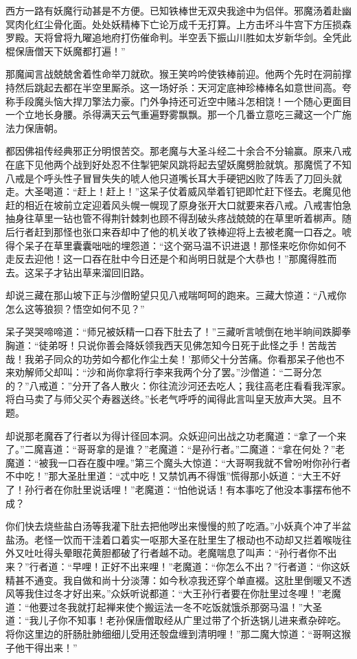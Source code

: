 \documentclass[12pt,UTF8]{ctexbook}
\begin{document}
西方一路有妖魔行动甚是不方便。已知铁棒世无双央我途中为侣伴。邪魔汤着赴幽冥肉化红尘骨化面。处处妖精棒下亡论万成千无打算。上方击坏斗牛宫下方压损森罗殿。天将曾将九曜追地府打伤催命判。半空丢下振山川胜如太岁新华剑。全凭此棍保唐僧天下妖魔都打遍！”

那魔闻言战兢兢舍着性命举刀就砍。猴王笑吟吟使铁棒前迎。他两个先时在洞前撑持然后跳起去都在半空里厮杀。这一场好杀：天河定底神珍棒棒名如意世间高。夸称手段魔头恼大捍刀擎法力豪。门外争持还可近空中赌斗怎相饶！一个随心更面目一个立地长身腰。杀得满天云气重遍野雾飘飘。那一个几番立意吃三藏这一个广施法力保唐朝。

都因佛祖传经典邪正分明恨苦交。那老魔与大圣斗经二十余合不分输赢。原来八戒在底下见他两个战到好处忍不住掣钯架风跳将起去望妖魔劈脸就筑。那魔慌了不知八戒是个呼头性子冒冒失失的唬人他只道嘴长耳大手硬钯凶败了阵丢了刀回头就走。大圣喝道：“赶上！赶上！”这呆子仗着威风举着钉钯即忙赶下怪去。老魔见他赶的相近在坡前立定迎着风头幌一幌现了原身张开大口就要来吞八戒。八戒害怕急抽身往草里一钻也管不得荆针棘刺也顾不得刮破头疼战兢兢的在草里听着梆声。随后行者赶到那怪也张口来吞却中了他的机关收了铁棒迎将上去被老魔一口吞之。唬得个呆子在草里囊囊咄咄的埋怨道：“这个弼马温不识进退！那怪来吃你你如何不走反去迎他！这一口吞在肚中今日还是个和尚明日就是个大恭也！”那魔得胜而去。这呆子才钻出草来溜回旧路。

却说三藏在那山坡下正与沙僧盼望只见八戒喘呵呵的跑来。三藏大惊道：“八戒你怎么这等狼狈？悟空如何不见？”

呆子哭哭啼啼道：“师兄被妖精一口吞下肚去了！”三藏听言唬倒在地半晌间跌脚拳胸道：“徒弟呀！只说你善会降妖领我西天见佛怎知今日死于此怪之手！苦哉苦哉！我弟子同众的功劳如今都化作尘土矣！’那师父十分苦痛。你看那呆子他也不来劝解师父却叫：“沙和尚你拿将行李来我两个分了罢。”沙僧道：“二哥分怎的？”八戒道：”分开了各人散火：你往流沙河还去吃人；我往高老庄看看我浑家。将白马卖了与师父买个寿器送终。”长老气呼呼的闻得此言叫皇天放声大哭。且不题。

却说那老魔吞了行者以为得计径回本洞。众妖迎问出战之功老魔道：“拿了一个来了。”二魔喜道：“哥哥拿的是谁？”老魔道：“是孙行者。”二魔道：“拿在何处？”老魔道：“被我一口吞在腹中哩。”第三个魔头大惊道：“大哥啊我就不曾吩咐你孙行者不中吃！”那大圣肚里道：“忒中吃！又禁饥再不得饿”慌得那小妖道：“大王不好了！孙行者在你肚里说话哩！”老魔道：“怕他说话！有本事吃了他没本事摆布他不成？

你们快去烧些盐白汤等我灌下肚去把他哕出来慢慢的煎了吃酒。”小妖真个冲了半盆盐汤。老怪一饮而干洼着口着实一呕那大圣在肚里生了根动也不动却又拦着喉咙往外又吐吐得头晕眼花黄胆都破了行者越不动。老魔喘息了叫声：“孙行者你不出来？”行者道：“早哩！正好不出来哩！”老魔道：“你怎么不出？”行者道：“你这妖精甚不通变。我自做和尚十分淡薄：如今秋凉我还穿个单直裰。这肚里倒暖又不透风等我住过冬才好出来。”众妖听说都道：“大王孙行者要在你肚里过冬哩！”老魔道：“他要过冬我就打起禅来使个搬运法一冬不吃饭就饿杀那弼马温！”大圣道：“我儿子你不知事！老孙保唐僧取经从广里过带了个折迭锅儿进来煮杂碎吃。将你这里边的肝肠肚肺细细儿受用还彀盘缠到清明哩！”那二魔大惊道：“哥啊这猴子他干得出来！”
\end{document}
